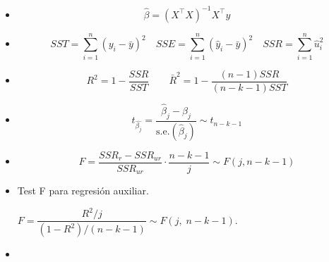 \documentclass[10pt,a4paper]{article}
\begin{document}
\begin{itemize}


\item  {\color{red} \[ \hat{\beta} = (X^{\top}X)^{-1}X^{\top}y \]}

\item 
	{\color{red}	\[ SST = \sum_{i=1}^{n} (y_i - \bar{y})^2 \quad SSE = \sum_{i=1}^{n} (\hat{y}_i - \bar{y})^2  \quad SSR = \sum_{i=1}^{n} \hat{u}_i^2\]}
		

    \item {\color{red} \[ R^2  = 1 - \frac{SSR}{SST} \quad \quad \bar{R}^2 =  1 - \frac{(n-1)SSR}{(n-k-1)SST} \]}

 \item {\color{red} \[ t_{\hat{\beta_j}}=\frac{\hat{\beta}_j - \beta_j}{\text{s.e.}(\hat{\beta}_j)} \sim t_{n-k-1} \]}

 \item {\color{red}\[
    F = \frac{SSR_{r} - SSR_{ur}}{SSR_{ur}} \cdot \frac{n - k - 1}{j} \sim F(j, n - k - 1)
    \]}

\item {\color{red}Test F para regresión auxiliar.}
\begin{center}
 {  \color{red}     \(F=\dfrac{R^{2}/j}{(1-R^{2})/(n-k-1)}
          \sim F(j,\;n-k-1)\).}
\end{center}


\item {}
\end{itemize}
\end{document}
